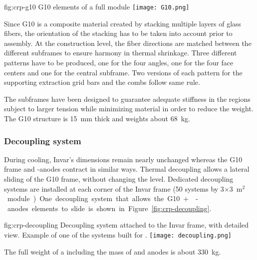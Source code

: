 \begin{dunefigure}{fig:crp-g10}
{G10 elements of a full  module}
\texttt{[image: G10.png]}
\end{dunefigure}

Since G10 is a composite material created by stacking multiple layers of glass fibers,  the orientation of the stacking has to be taken into account prior to assembly.
At the construction level, the fiber directions are matched between the different subframes to ensure harmony in thermal shrinkage. Three different patterns have to be produced, one for the four angles, one for the four face centers and one for the central subframe.
Two versions of each pattern for the supporting extraction grid bars and the combs follow same rule.

The subframes have been designed to guarantee %
adequate stiffness in the  regions subject to larger tension while minimizing material in order to reduce the weight.
The G10 structure is \SI{15}{mm} thick and weights about \SI{68}{kg}. 

\subsubsection{Decoupling system}
During cooling, Invar's dimensions remain nearly unchanged whereas the G10 frame and -anodes contract in similar ways. Thermal decoupling allows a lateral sliding of the G10 frame, without changing the level. 
Dedicated decoupling systems are installed at each corner of the Invar frame (\num{50} systems by  \num{3}$\times$\SI{3}{m$^{2}$} module). One decoupling system that allows the G10+ -anodes elements to slide is shown in  Figure~\ref{fig:crp-decoupling}.

\begin{dunefigure}{fig:crp-decoupling}
{Decoupling system attached to the Invar frame, with detailed view. Example of one of the systems built for .}
\texttt{[image: decoupling.png]}
\end{dunefigure}

The full weight of a  including the mass of  and anodes is about \SI{330}{kg}.

